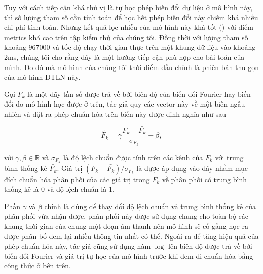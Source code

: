 			Tuy với cách tiếp cận khá thú vị là tự học phép biến đổi dữ liệu ở mô hình này, thì số lượng tham số cần tính toán để học hết phép biến đổi này chiếm khá nhiều chi phí tính toán. Nhưng kết quả lọc nhiễu của mô hình này khá tốt () với điểm metrics khá cao trên tập kiểm thử của chúng tôi. Đồng thời với lượng tham số khoảng 967000 và tốc độ chạy thời gian thực trên một khung dữ liệu vào khoảng 2ms, chúng tôi cho rằng đây là một hướng tiếp cận phù hợp cho bài toán của mình. Do đó mà mô hình của chúng tôi thời điểm đầu chính là phiên bản thu gọn của mô hình DTLN này.
			
			
				 Gọi $F_k$ là một dãy tần số được trả về bởi biên độ của biến đổi Fourier hay biến đổi do mô hình học được ở trên, tác giả \cite{dtln} quy các vector này về một biến ngẫu nhiên và đặt ra phép chuẩn hóa trên biến này được định nghĩa như sau
					
						\begin{equation}
							\tilde{F_k} = \gamma \frac{F_k - \bar{F_k}}{\sigma_{F_k}} + \beta,
						\label{rl::iLN_formula}
						\end{equation}
					
					\noindent với $\gamma, \beta \in \mathbb{R}$ và $\sigma_{F_k}$ là độ lệch chuẩn được tính trên các kênh của $F_k$ với trung bình thống kê $\bar{F_k}$. Giá trị $(F_k - \bar{F_k})/\sigma_{F_k}$ là   được áp dụng vào đây nhằm mục đích chuẩn hóa phân phối của các giá trị trong $F_k$ về phân phối có trung bình thống kê là $0$ và độ lệch chuẩn là $1$.
					
					Phần $\gamma$ và $\beta$ chính là dùng để thay đổi độ lệch chuẩn và trung bình thống kê của phân phối vừa nhận được, phân phối này được sử dụng chung cho toàn bộ các khung thời gian của chung một đoạn âm thanh nên mô hình sẽ cố gắng học ra được phân bố đem lại nhiều thông tin nhất có thể. Ngoài ra để tăng hiệu quả của phép chuẩn hóa này, tác giả cũng sử dụng hàm $\log$ lên biên độ được trả về bởi biến đổi Fourier và giá trị tự học của mô hình trước khi đem đi chuẩn hóa bằng công thức ở bên trên.
	

